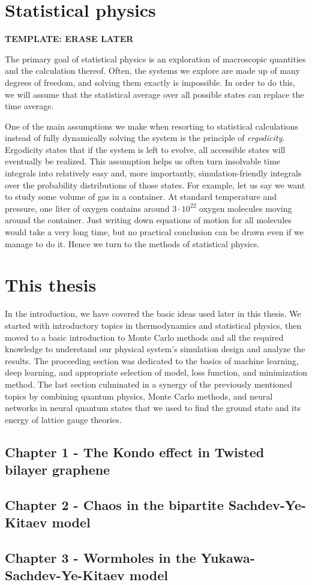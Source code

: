 \section{Statistical physics}
\label{sec:statPhys}
\textbf{TEMPLATE: ERASE LATER}
\par
The primary goal of statistical physics is an exploration of macroscopic quantities and the calculation thereof. Often, the systems we explore are made up of many degrees of freedom, and solving them exactly is impossible. In order to do this, we will assume that the statistical average over all possible states can replace the time average. 
\par 
One of the main assumptions we make when resorting to statistical calculations instead of fully dynamically solving the system is the principle of \textit{ergodicity}. Ergodicity states that if the system is left to evolve, all accessible states will eventually be realized. This assumption helps us often turn insolvable time integrals into relatively easy and, more importantly, simulation-friendly integrals over the probability distributions of those states. For example, let us say we want to study some volume of gas in a container. At standard temperature and pressure, one liter of oxygen contains around $3\cdot 10^{22}$ oxygen molecules moving around the container. Just writing down equations of motion for all molecules would take a very long time, but no practical conclusion can be drawn even if we manage to do it. Hence we turn to the methods of statistical physics.
\par


\section{This thesis}
In the introduction, we have covered the basic ideas used later in this thesis. We started with introductory topics in thermodynamics and statistical physics, then moved to a basic introduction to Monte Carlo methods and all the required knowledge to understand our physical system's simulation design and analyze the results. The proceeding section was dedicated to the basics of machine learning, deep learning, and appropriate selection of model, loss function, and minimization method. The last section culminated in a synergy of the previously mentioned topics by combining quantum physics, Monte Carlo methods, and neural networks in neural quantum states that we used to find the ground state and its energy of lattice gauge theories.

\subsection{Chapter 1 - The Kondo effect in Twisted bilayer graphene}


\subsection{Chapter 2 - Chaos in the bipartite Sachdev-Ye-Kitaev model}



\subsection{Chapter 3 - Wormholes in the Yukawa-Sachdev-Ye-Kitaev model}

